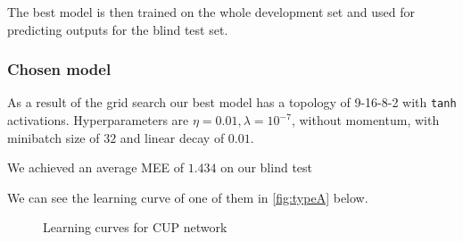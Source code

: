 
 The best model is then trained on the whole development set and used for predicting outputs for the blind test set.

\subsubsection{Chosen model}


As a result of the grid search our best model has a topology of 9-16-8-2 with \texttt{tanh} activations. Hyperparameters are $\eta=0.01,\lambda=10^{-7}$, without momentum, with minibatch size of $32$ and linear decay of $0.01$.

We achieved an average MEE of $1.434$ on our blind test %

We can see the learning curve of one of them in \cref{fig:typeA} below.

\begin{figure}[h]
    \centering
    \caption{Learning curves for CUP network}
\end{figure}

